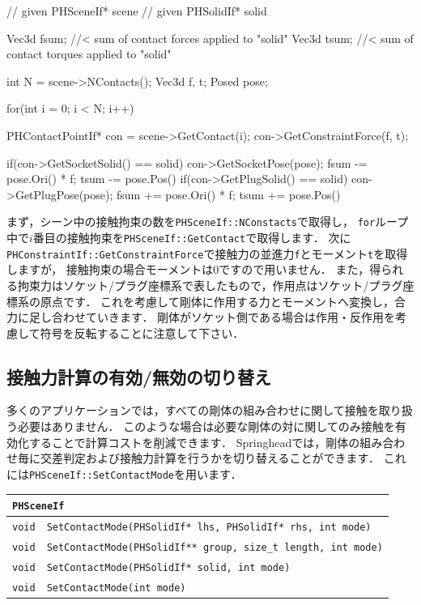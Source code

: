\begin{sourcecode}
// given PHSceneIf* scene
// given PHSolidIf* solid

Vec3d fsum;    //< sum of contact forces applied to "solid"
Vec3d tsum;    //< sum of contact torques applied to "solid"

int N = scene->NContacts();
Vec3d f, t;
Posed pose;

for(int i = 0; i < N; i++){
    PHContactPointIf* con = scene->GetContact(i);
    con->GetConstraintForce(f, t);

    if(con->GetSocketSolid() == solid){
        con->GetSocketPose(pose);
        fsum -= pose.Ori() * f;
        tsum -= pose.Pos() %
    }
    if(con->GetPlugSolid() == solid){
        con->GetPlugPose(pose);
        fsum += pose.Ori() * f;
        tsum += pose.Pos() %
    }
}
\end{sourcecode}
\KLUDGE まず，シーン中の接触拘束の数を\texttt{PHSceneIf::NConstacts}\KLUDGE で取得し，
\texttt{for}\KLUDGE ループ中で$i$\KLUDGE 番目の接触拘束を\texttt{PHSceneIf::GetContact}\KLUDGE で取得します．
\KLUDGE 次に\texttt{PHConstraintIf::GetConstraintForce}\KLUDGE で接触力の並進力\texttt{f}\KLUDGE とモーメント\texttt{t}\KLUDGE を取得しますが，
\KLUDGE 接触拘束の場合モーメントは$0$\KLUDGE ですので用いません．
\KLUDGE また，得られる拘束力はソケット/\KLUDGE プラグ座標系で表したもので，作用点はソケット/\KLUDGE プラグ座標系の原点です．
\KLUDGE これを考慮して剛体に作用する力とモーメントへ変換し，合力に足し合わせていきます．
\KLUDGE 剛体がソケット側である場合は作用・反作用を考慮して符号を反転することに注意して下さい．


\subsection*{\KLUDGE 接触力計算の有効/\KLUDGE 無効の切り替え}

\KLUDGE 多くのアプリケーションでは，すべての剛体の組み合わせに関して接触を取り扱う必要はありません．
\KLUDGE このような場合は必要な剛体の対に関してのみ接触を有効化することで計算コストを削減できます．
Springhead\KLUDGE では，剛体の組み合わせ毎に交差判定および接触力計算を行うかを切り替えることができます．
\KLUDGE これには\texttt{PHSceneIf::SetContactMode}\KLUDGE を用います．

\begin{center}
\begin{longtable}{p{.1\hsize}p{.9\hsize}}
\multicolumn{2}{l}{\texttt{PHSceneIf}}						\\ \midrule
\texttt{void}	& \texttt{SetContactMode(PHSolidIf* lhs, PHSolidIf* rhs, int mode)} \\
\texttt{void}   & \texttt{SetContactMode(PHSolidIf** group, size\_t length, int mode)} \\
\texttt{void}   & \texttt{SetContactMode(PHSolidIf* solid, int mode)} \\
\texttt{void}   & \texttt{SetContactMode(int mode)}
\end{longtable}
\end{center}

